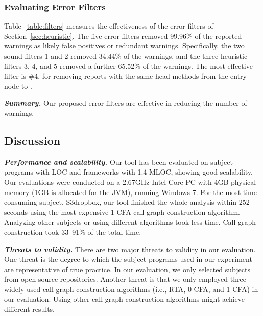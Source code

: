 \subsubsection{Evaluating Error Filters}
\label{sec:filters}

Table~\ref{table:filters} measures the effectiveness of the
error filters of Section~\ref{sec:heuristic}.
The five error filters removed 99.96\% of the reported warnings as likely false positives
or redundant warnings. Specifically, the two sound filters 1 and 2 
removed 34.44\% of the warnings, and the three heuristic filters 3, 4, and 5
removed a further 65.52\% of the warnings. The most effective filter is
\#4, for removing reports with the same head methods from the entry node to .

\vspace{1mm}

\noindent \textbf{\textit{Summary.}} Our proposed error filters are 
effective in reducing the number of warnings.


\subsection{Discussion}

\label{sec:performance}

\noindent \textbf{\textit{Performance and scalability.}} Our tool
has been evaluated on \subnum subject programs with \totaloc LOC and frameworks
with 1.4 MLOC, showing good scalability. Our evaluations
were conducted on a 2.67GHz Intel Core PC with 4GB
physical memory (1GB is allocated for the JVM), running Windows 7.
For the most time-consuming subject, S3dropbox, our tool finished the whole analysis
within 252 seconds using the most expensive 1-CFA call graph construction
algorithm. Analyzing other subjects or using different algorithms took less time.
Call graph construction took 33--91\% of the total time.


\vspace{1mm}

\noindent \textbf{\textit{Threats to validity.}}
There are two major threats to validity in our evaluation. 
One threat is the degree to which the subject programs
used in our experiment are representative of true practice.
In our evaluation, we only selected subjects from
open-source repositories. Another threat is that we only employed three
widely-used call graph construction algorithms (i.e., RTA, 0-CFA, and 1-CFA) 
in our evaluation. Using other 
call graph construction algorithms %
 might achieve different results.


